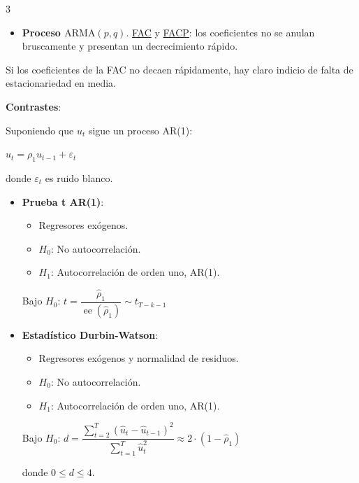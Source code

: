 \documentclass[10pt, a4paper, landscape]{article}
\DeclareMathOperator{\se}{ee}
\begin{document}
\begin{multicols}{3}
\columnbreak

\begin{itemize}[leftmargin=*]
	\item \textbf{Proceso \( \text{ARMA}(p, q) \)}. \underline{FAC} y \underline{FACP}: los coeficientes no se anulan bruscamente y presentan un decrecimiento rápido.
\end{itemize}

Si los coeficientes de la FAC no decaen rápidamente, hay claro indicio de falta de estacionariedad en media.

\textbf{Contrastes}:

Suponiendo que \( u_{t} \) sigue un proceso AR(1):

\begin{center}
	\( u_{t} = \rho_{1} u_{t - 1} + \varepsilon_{t} \)
\end{center}

donde \( \varepsilon_{t} \) es ruido blanco.

\begin{itemize}[leftmargin=*]
	\item \textbf{Prueba t AR(1)}:
	\begin{itemize}[leftmargin=*]
		\item Regresores exógenos.
		\item \( H_{0} \): No autocorrelación.
		\item \( H_{1} \): Autocorrelación de orden uno, AR(1).
	\end{itemize}
	\begin{center}
		Bajo \( H_{0} \): \quad \( t = \dfrac{\hat{\rho}_{1}}{\se(\hat{\rho}_{1})} \sim t_{T - k - 1} \)
	\end{center}
\end{itemize}

\begin{itemize}[leftmargin=*]
	\item \textbf{Estadístico Durbin-Watson}:
	\begin{itemize}[leftmargin=*]
		\item Regresores exógenos y normalidad de residuos.
		\item \( H_{0} \): No autocorrelación.
		\item \( H_{1} \): Autocorrelación de orden uno, AR(1).
	\end{itemize}
	\begin{center}
		Bajo \( H_{0} \): \quad \( d = \dfrac{\sum_{t = 2}^{T} (\hat{u}_{t} - \hat{u}_{t - 1})^{2}}{\sum_{t = 1}^{T} \hat{u}_{t}^{2}} \approx 2 \cdot (1 - \hat{\rho}_{1}) \)
	\end{center}
	donde \( 0 \leq d \leq 4 \).
\end{itemize}


\end{multicols}
\end{document}

